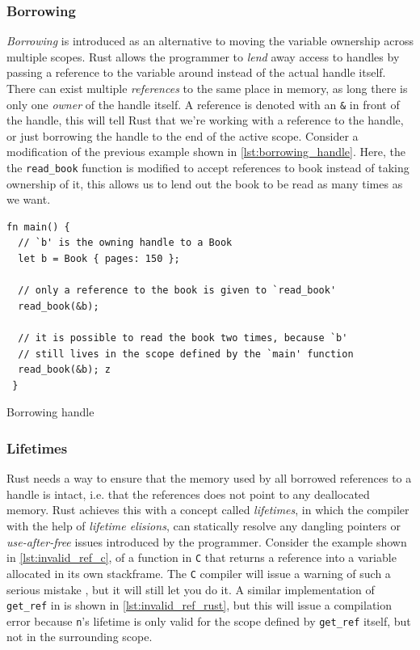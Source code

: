\subsubsection{Borrowing}

\emph{Borrowing} is introduced as an alternative to moving the variable ownership across multiple scopes.
Rust allows the programmer to \emph{lend} away access to handles by passing a reference to the variable around instead of the actual handle itself.
There can exist multiple \emph{references} to the same place in memory, as long there is only one \emph{owner} of the handle itself.
A reference is denoted with an \texttt{\&} in front of the handle, this will tell Rust that we're working with a reference to the handle, or just borrowing the handle to the end of the active scope.
Consider a modification of the previous example shown in \autoref{lst:borrowing_handle}.
Here, the the \texttt{read\_book} function is modified to accept references to book instead of taking ownership of it, this allows us to lend out the book to be read as many times as we want.

\begin{listing}[tb]
\begin{verbatim}
fn main() {
  // `b' is the owning handle to a Book
  let b = Book { pages: 150 };

  // only a reference to the book is given to `read_book'
  read_book(&b);

  // it is possible to read the book two times, because `b'
  // still lives in the scope defined by the `main' function
  read_book(&b); z
 }
\end{verbatim}
\caption{Borrowing handle}
\label{lst:borrowing_handle}
\end{listing}

\subsubsection{Lifetimes}

Rust needs a way to ensure that the memory used by all borrowed references to a handle is intact, i.e. that the references does not point to any deallocated memory.
Rust achieves this with a concept called \emph{lifetimes}, in which the compiler with the help of \emph{lifetime elisions}, can statically resolve any dangling pointers or \emph{use-after-free} issues introduced by the programmer.
Consider the example shown in \autoref{lst:invalid_ref_c}, of a function in \texttt{C} that returns a reference into a variable allocated in its own stackframe.
The \texttt{C} compiler will issue a warning of such a serious mistake , but it will still let you do it.
A similar implementation of \texttt{get\_ref} in \rust is shown in \autoref{lst:invalid_ref_rust}, but this will issue a compilation error because \texttt{n}'s lifetime is only valid for the scope defined by \texttt{get\_ref} itself, but not in the surrounding scope.


